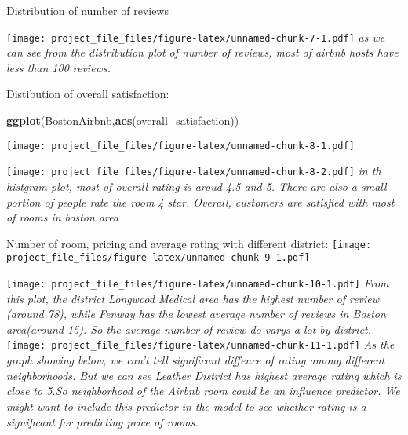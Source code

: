 \documentclass[]{article}
\newenvironment{Shaded}{\begin{snugshade}}{\end{snugshade}}
\newcommand{\KeywordTok}[1]{\textcolor[rgb]{0.13,0.29,0.53}{\textbf{#1}}}
\newcommand{\DataTypeTok}[1]{\textcolor[rgb]{0.13,0.29,0.53}{#1}}
\newcommand{\StringTok}[1]{\textcolor[rgb]{0.31,0.60,0.02}{#1}}
\newcommand{\OperatorTok}[1]{\textcolor[rgb]{0.81,0.36,0.00}{\textbf{#1}}}
\newcommand{\NormalTok}[1]{#1}
\begin{document}
Distribution of number of reviews

\begin{Shaded}
\end{Shaded}

\texttt{[image: project\_file\_files/figure-latex/unnamed-chunk-7-1.pdf]}
\emph{as we can see from the distribution plot of number of reviews,
most of airbnb hosts have less than 100 reviews.}

Distibution of overall satisfaction:

\begin{Shaded}
\begin{Highlighting}[]
\KeywordTok{ggplot}\NormalTok{(BostonAirbnb,}\KeywordTok{aes}\NormalTok{(overall_satisfaction))}
\end{Highlighting}
\end{Shaded}

\texttt{[image: project\_file\_files/figure-latex/unnamed-chunk-8-1.pdf]}

\begin{Shaded}
\end{Shaded}

\texttt{[image: project\_file\_files/figure-latex/unnamed-chunk-8-2.pdf]}
\emph{in th histgram plot, most of overall rating is aroud 4.5 and 5.
There are also a small portion of people rate the room 4 star. Overall,
customers are satisfied with most of rooms in boston area}

Number of room, pricing and average rating with different district:
\texttt{[image: project\_file\_files/figure-latex/unnamed-chunk-9-1.pdf]}

\texttt{[image: project\_file\_files/figure-latex/unnamed-chunk-10-1.pdf]}
\emph{From this plot, the district Longwood Medical area has the highest
number of review (around 78), while Fenway has the lowest average number
of reviews in Boston area(around 15). So the average number of review do
varys a lot by district.}
\texttt{[image: project\_file\_files/figure-latex/unnamed-chunk-11-1.pdf]}
\emph{As the graph showing below, we can't tell significant diffence of
rating among different neighborhoods. But we can see Leather District
has highest average rating which is close to 5.So neighborhood of the
Airbnb room could be an influence predictor. We might want to include
this predictor in the model to see whether rating is a significant for
predicting price of rooms.}
\end{document}
